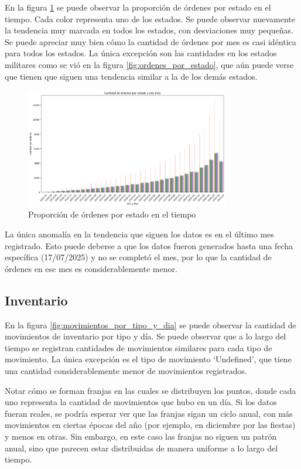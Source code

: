 En la figura \ref{fig:ordenes_por_estado_en_el_tiempo} se puede observar la proporción de órdenes por estado en el tiempo. Cada color representa uno de los estados. Se puede observar nuevamente la tendencia muy marcada en todos los estados, con desviaciones muy pequeñas. Se puede apreciar muy bien cómo la cantidad de órdenes por mes es casi idéntica para todos los estados. La única excepción son las cantidades en los estados militares como se vió en la figura \ref{fig:ordenes_por_estado}, que aún puede verse que tienen que siguen una tendencia similar a la de los demás estados.

\begin{figure}[H]
    \centering
    \includegraphics[width=0.8\textwidth]{imagenes/datos_uniformes/ordenes_por_estado_en_el_tiempo.png}
    \caption{Proporción de órdenes por estado en el tiempo}
    \label{fig:ordenes_por_estado_en_el_tiempo}
\end{figure}

La única anomalía en la tendencia que siguen los datos es en el último mes registrado. Esto puede deberse a que los datos fueron generados hasta una fecha específica (17/07/2025) y no se completó el mes, por lo que la cantidad de órdenes en ese mes es considerablemente menor.

\subsection{Inventario}

En la figura \ref{fig:movimientos_por_tipo_y_dia} se puede observar la cantidad de movimientos de inventario por tipo y día. Se puede observar que a lo largo del tiempo se registran cantidades de movimientos similares para cada tipo de movimiento. La única excepción es el tipo de movimiento `Undefined', que tiene una cantidad considerablemente menor de movimientos registrados.

Notar cómo se forman franjas en las cuales se distribuyen los puntos, donde cada uno representa la cantidad de movimientos que hubo en un día. Si los datos fueran reales, se podría esperar ver que las franjas sigan un ciclo anual, con más movimientos en ciertas épocas del año (por ejemplo, en diciembre por las fiestas) y menos en otras. Sin embargo, en este caso las franjas no siguen un patrón anual, sino que parecen estar distribuidas de manera uniforme a lo largo del tiempo.

